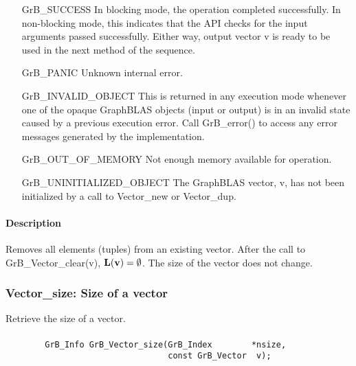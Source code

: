 \begin{itemize}[leftmargin=2.1in]
    \item[{\sf GrB\_SUCCESS}]         In blocking mode, the operation completed
    successfully. In non-blocking mode, this indicates that the API checks 
    for the input arguments passed successfully. Either way, output vector 
    {\sf v} is ready to be used in the next method of the sequence.

    \item[{\sf GrB\_PANIC}]           Unknown internal error.
    
    \item[{\sf GrB\_INVALID\_OBJECT}] This is returned in any execution mode 
    whenever one of the opaque GraphBLAS objects (input or output) is in an invalid 
    state caused by a previous execution error.  Call {\sf GrB\_error()} to access 
    any error messages generated by the implementation.

    \item[{\sf GrB\_OUT\_OF\_MEMORY}] Not enough memory available for operation.
    
    \item[{\sf GrB\_UNINITIALIZED\_OBJECT}]  The GraphBLAS vector, {\sf v}, has 
    not been initialized by a call to {\sf Vector\_new} or {\sf Vector\_dup}.
    
\end{itemize}

\paragraph{Description}

Removes all elements (tuples) from an existing vector. After the call to
{\sf GrB\_Vector\_clear(v)}, 
$\mathbf{L}({\bf v}) = \emptyset$. The size of the vector does not change. 


\subsubsection{{\sf Vector\_size}: Size of a vector}

Retrieve the size of a vector.

\paragraph{\syntax}

\begin{verbatim}
        GrB_Info GrB_Vector_size(GrB_Index        *nsize,
                                 const GrB_Vector  v);
\end{verbatim}

